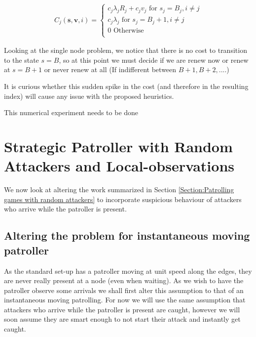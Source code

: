 \documentclass[a4paper,10pt]{article}
\theoremstyle{definition}
\theoremstyle{definition}
\theoremstyle{remark}
\theoremstyle{definition}
\begin{document}
\begin{align*}
C_{j}(\bm{s},\bm{v},i)=\begin{cases}
c_{j} \lambda_{j} R_{j} + c_{j} v_{j}  \text{ for } s_{j}=B_{j},i \neq j \\ 
c_{j} \lambda_{j} \text{ for } s_{j}=B_{j}+1,i \neq j  \\
0 \text{ Otherwise} \\
\end{cases}
\end{align*}

Looking at the single node problem, we notice that there is no cost to transition to the state $s=B$, so at this point we must decide if we are renew now or renew at $s=B+1$ or never renew at all (If indifferent between $B+1,B+2,....$)

It is curious whether this sudden spike in the cost (and therefore in the resulting index) will cause any issue with the proposed heuristics.

\begin{Huge}
This numerical experiment needs to be done
\end{Huge}


\section{Strategic Patroller with Random Attackers and Local-observations}
\label{Section:Patrolling games with random attackers and local-observations}
We now look at altering the work summarized in Section \ref{Section:Patrolling games with random attackers} to incorporate suspicious behaviour of attackers who arrive while the patroller is present.

\subsection{Altering the problem for instantaneous moving patroller}
As the standard set-up has a patroller moving at unit speed along the edges, they are never really present at a node (even when waiting). As we wish to have the patroller observe some arrivals we shall first alter this assumption to that of an instantaneous moving patrolling. For now we will use the same assumption that attackers who arrive while the patroller is present are caught, however we will soon assume they are smart enough to not start their attack and instantly get caught.
\end{document}
